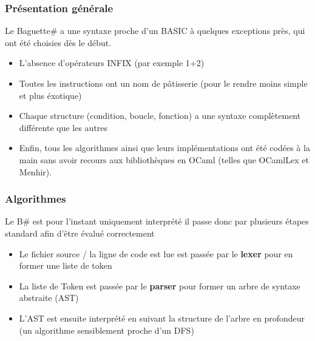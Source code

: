 \documentclass{beamer}
\newcommand{\bsf}{Baguette\# }
\newcommand{\bs}{B\# }
\begin{document}
    \begin{frame}
        \frametitle{Présentation générale}
        
        Le \bsf a une syntaxe proche d'un BASIC à quelques exceptions près, qui ont été choisies dès le début.
        \begin{itemize}
            \item<1> L'absence d'opérateurs INFIX (par exemple 1+2)
            \item<2> Toutes les instructions ont un nom de pâtisserie (pour le rendre moins simple et plus éxotique)
            \item<3> Chaque structure (condition, boucle, fonction) a une syntaxe complètement différente que les autres
            \item<4> Enfin, tous les algorithmes ainsi que leurs implémentations ont été codées à la main sans avoir recours aux bibliothèques 
            en OCaml (telles que OCamlLex et Menhir).
        \end{itemize}
    \end{frame}

    \begin{frame}
        \frametitle{Algorithmes}
        Le \bs est pour l'instant uniquement interprété il passe donc par plusieurs étapes standard afin d'être évalué correctement
        \begin{itemize}
            \item<1> Le fichier source / la ligne de code est lue est passée par
            le \textbf{lexer} pour en former une liste de token
            \item<2> La liste de Token est passée par le \textbf{parser} pour former un arbre de syntaxe abstraite (AST)
            \item<3> L'AST est ensuite interprété en suivant la structure de l'arbre en profondeur (un algorithme sensiblement proche d'un DFS)
        \end{itemize}
    \end{frame}
\end{document}

